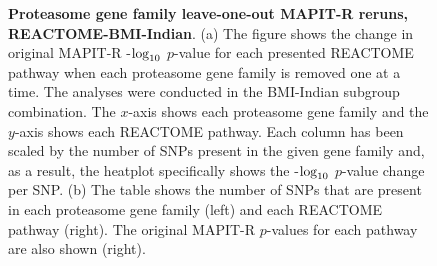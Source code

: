 \documentclass[10pt,a4paper]{article}
\def\log{{\rm log}}
\begin{document}
\begin{figure}[ht]
\centering
\vspace*{-.5cm}
\par
{}
\caption[TBD]{\textbf{Proteasome gene family leave-one-out MAPIT-R reruns, REACTOME-BMI-Indian}. (a) The figure shows the change in original MAPIT-R -$\log_{10}$ $p$-value for each presented REACTOME pathway when each proteasome gene family is removed one at a time. The analyses were conducted in the BMI-Indian subgroup combination. The $x$-axis shows each proteasome gene family and the $y$-axis shows each REACTOME pathway. Each column has been scaled by the number of SNPs present in the given gene family and, as a result, the heatplot specifically shows the -$\log_{10}$ $p$-value change per SNP. (b) The table shows the number of SNPs that are present in each proteasome gene family (left) and each REACTOME pathway (right). The original MAPIT-R $p$-values for each pathway are also shown (right).}

\end{figure}
\end{document}
